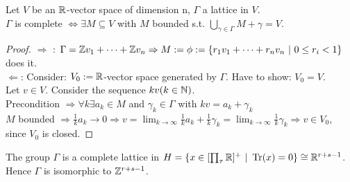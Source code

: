 \begin{Lem}
Let $V$ be an $\mathbb{R}$-vector space of dimension n, $\Gamma$ a lattice in $V$.\\
$\Gamma$ is complete $\iff \exists M \subseteq V$ with $M$ bounded s.t. $\bigcup_{\gamma \in \Gamma} M + \gamma =V$.
\end{Lem}

\begin{proof}
\glqq $\Rightarrow$ \grqq: $\Gamma = \mathbb{Z} v_1 + \dots + \mathbb{Z} v_n \Rightarrow M:= \phi:=\{r_1v_1+ \dots+r_n v_n \ | \ 0 \leq r_i <1\}$ does it.\\
\glqq $\Leftarrow$\grqq: Consider: $V_0:= \mathbb{R}$-vector space generated by $\Gamma$. Have to show: $V_0=V$.\\
Let $v \in V$. Consider the sequence $kv (k \in \mathbb{N})$.\\
Precondition $\Rightarrow \forall k \exists a_k \in M$ and $\gamma_k \in \Gamma$ with $kv = a_k + \gamma_k$\\
$M$ bounded $\Rightarrow \frac{1}{k}a_k \to 0 \Rightarrow v= \lim_{k \to \infty} \frac{1}{k}a_k + \frac{1}{k}\gamma_k = \lim_{k \to \infty} \frac{1}{k} \gamma_k \Rightarrow v \in V_0$, since $V_0$ is closed.
\end{proof}

\begin{Satz}
The group $\Gamma$ is a complete lattice in $H= \{ x \in [\prod_\tau \mathbb{R}]^+ \ | \ \operatorname{Tr}(x)=0\} \cong \mathbb{R}^{r+s-1}$. Hence $\Gamma$ is isomorphic to $\mathbb{Z}^{r+s-1}$.
\end{Satz}

